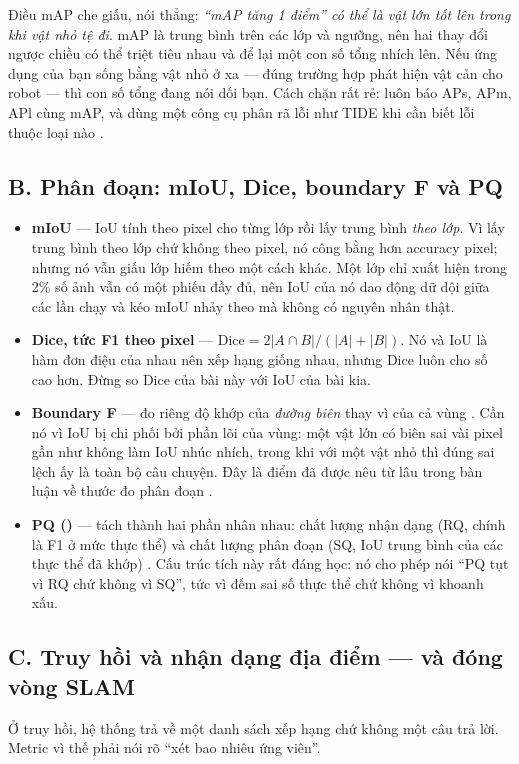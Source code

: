 \documentclass[../../deep_learning.tex]{subfiles}
\begin{document}
Điều mAP che giấu, nói thẳng: \emph{``mAP tăng 1 điểm'' có thể là vật lớn tốt lên trong khi vật nhỏ tệ đi}. mAP là trung bình trên các lớp và ngưỡng, nên hai thay đổi ngược chiều có thể triệt tiêu nhau và để lại một con số tổng nhích lên. Nếu ứng dụng của bạn sống bằng vật nhỏ ở xa --- đúng trường hợp phát hiện vật cản cho robot --- thì con số tổng đang nói dối bạn. Cách chặn rất rẻ: luôn báo APs, APm, APl cùng mAP, và dùng một công cụ phân rã lỗi như TIDE khi cần biết lỗi thuộc loại nào \cite{bolya2020tide,hoiem2012diagnosing}.

\subsection{B. Phân đoạn: mIoU, Dice, boundary F và PQ}
\begin{itemize}
\item \textbf{mIoU} --- IoU tính theo pixel cho từng lớp rồi lấy trung bình \emph{theo lớp}. Vì lấy trung bình theo lớp chứ không theo pixel, nó công bằng hơn accuracy pixel; nhưng nó vẫn giấu lớp hiếm theo một cách khác. Một lớp chỉ xuất hiện trong 2\% số ảnh vẫn có một phiếu đầy đủ, nên IoU của nó dao động dữ dội giữa các lần chạy và kéo mIoU nhảy theo mà không có nguyên nhân thật.
\item \textbf{Dice, tức F1 theo pixel} --- \(\text{Dice} = 2|A \cap B| / (|A| + |B|)\). Nó và IoU là hàm đơn điệu của nhau nên xếp hạng giống nhau, nhưng Dice luôn cho số cao hơn. Đừng so Dice của bài này với IoU của bài kia.
\item \textbf{Boundary F} --- đo riêng độ khớp của \emph{đường biên} thay vì của cả vùng \cite{perazzi2016davis}. Cần nó vì IoU bị chi phối bởi phần lõi của vùng: một vật lớn có biên sai vài pixel gần như không làm IoU nhúc nhích, trong khi với một vật nhỏ thì đúng sai lệch ấy là toàn bộ câu chuyện. Đây là điểm đã được nêu từ lâu trong bàn luận về thước đo phân đoạn \cite{csurka2013segmentation}.
\item \textbf{PQ ()} --- tách thành hai phần nhân nhau: chất lượng nhận dạng (RQ, chính là F1 ở mức thực thể) và chất lượng phân đoạn (SQ, IoU trung bình của các thực thể đã khớp) \cite{kirillov2019panoptic}. Cấu trúc tích này rất đáng học: nó cho phép nói ``PQ tụt vì RQ chứ không vì SQ'', tức vì đếm sai số thực thể chứ không vì khoanh xấu.
\end{itemize}

\subsection{C. Truy hồi và nhận dạng địa điểm --- và đóng vòng SLAM}
Ở truy hồi, hệ thống trả về một danh sách xếp hạng chứ không một câu trả lời. Metric vì thế phải nói rõ ``xét bao nhiêu ứng viên''.
\end{document}
